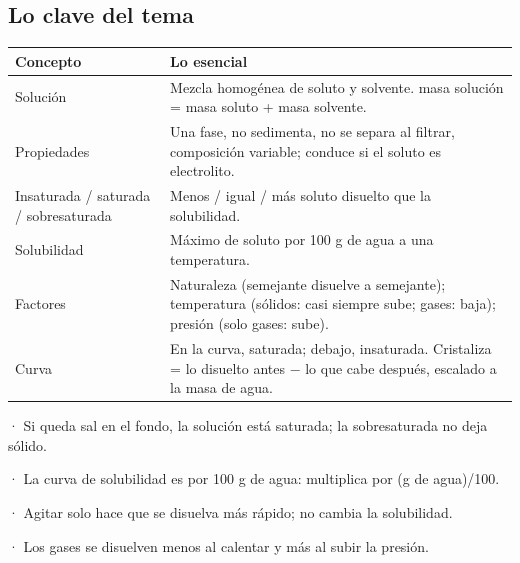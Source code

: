 \subsection{Lo clave del tema}
\begin{center}\small
\begin{tabularx}{\linewidth}{@{}>{\raggedright\arraybackslash\hsize=0.96\hsize}X>{\raggedright\arraybackslash\hsize=1.04\hsize}X@{}}
\toprule
\textbf{Concepto} & \textbf{Lo esencial} \\
\midrule
Solución & Mezcla homogénea de soluto y solvente. masa solución = masa soluto + masa solvente. \\
Propiedades & Una fase, no sedimenta, no se separa al filtrar, composición variable; conduce si el soluto es electrolito. \\
Insaturada / saturada / sobresaturada & Menos / igual / más soluto disuelto que la solubilidad. \\
Solubilidad & Máximo de soluto por 100 g de agua a una temperatura. \\
Factores & Naturaleza (semejante disuelve a semejante); temperatura (sólidos: casi siempre sube; gases: baja); presión (solo gases: sube). \\
Curva & En la curva, saturada; debajo, insaturada. Cristaliza = lo disuelto antes \ensuremath{-} lo que cabe después, escalado a la masa de agua. \\
\bottomrule
\end{tabularx}
\end{center}
  
\begin{clave}[{Recuerda}] · Si queda sal en el fondo, la solución está saturada; la sobresaturada no deja sólido.\par · La curva de solubilidad es por 100 g de agua: multiplica por (g de agua)/100.\par · Agitar solo hace que se disuelva más rápido; no cambia la solubilidad.\par · Los gases se disuelven menos al calentar y más al subir la presión.\end{clave}
 
